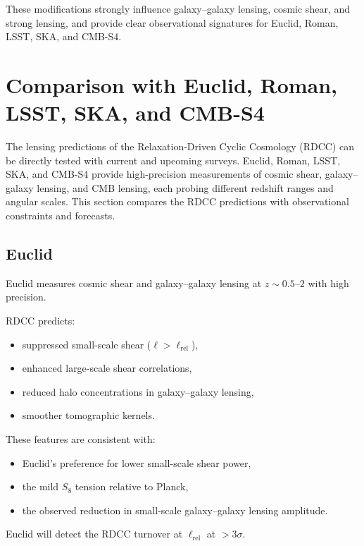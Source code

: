 \documentclass[11pt,a4paper]{article}
\begin{document}
These modifications strongly influence galaxy–galaxy lensing, cosmic shear, and strong
lensing, and provide clear observational signatures for Euclid, Roman, LSST, SKA, and CMB-S4.

\section{Comparison with Euclid, Roman, LSST, SKA, and CMB-S4}

The lensing predictions of the Relaxation-Driven Cyclic Cosmology (RDCC) can be directly
tested with current and upcoming surveys. Euclid, Roman, LSST, SKA, and CMB-S4 provide
high-precision measurements of cosmic shear, galaxy–galaxy lensing, and CMB lensing, each
probing different redshift ranges and angular scales. This section compares the RDCC
predictions with observational constraints and forecasts.

\subsection{Euclid}

Euclid measures cosmic shear and galaxy–galaxy lensing at $z \sim 0.5$–$2$ with high precision.

RDCC predicts:
\begin{itemize}
\item suppressed small-scale shear ($\ell > \ell_{\mathrm{rel}}$),
\item enhanced large-scale shear correlations,
\item reduced halo concentrations in galaxy–galaxy lensing,
\item smoother tomographic kernels.
\end{itemize}

These features are consistent with:
\begin{itemize}
\item Euclid's preference for lower small-scale shear power,
\item the mild $S_{8}$ tension relative to Planck,
\item the observed reduction in small-scale galaxy–galaxy lensing amplitude.
\end{itemize}

Euclid will detect the RDCC turnover at $\ell_{\mathrm{rel}}$ at $>3\sigma$.
\end{document}
